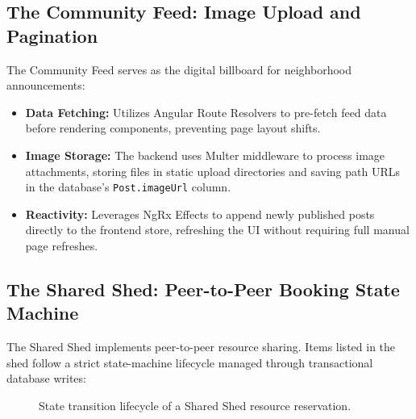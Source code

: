 \subsection{The Community Feed: Image Upload and Pagination}
The Community Feed serves as the digital billboard for neighborhood announcements:
\begin{itemize}
    \item \textbf{Data Fetching:} Utilizes Angular Route Resolvers to pre-fetch feed data before rendering components, preventing page layout shifts.
    \item \textbf{Image Storage:} The backend uses Multer middleware to process image attachments, storing files in static upload directories and saving path URLs in the database's \texttt{Post.imageUrl} column.
    \item \textbf{Reactivity:} Leverages NgRx Effects to append newly published posts directly to the frontend store, refreshing the UI without requiring full manual page refreshes.
\end{itemize}

\subsection{The Shared Shed: Peer-to-Peer Booking State Machine}
The Shared Shed implements peer-to-peer resource sharing. Items listed in the shed follow a strict state-machine lifecycle managed through transactional database writes:

\begin{figure}[h]
\centering
{}
\caption{State transition lifecycle of a Shared Shed resource reservation.}
\label{fig:resource-state-machine}
\end{figure}

